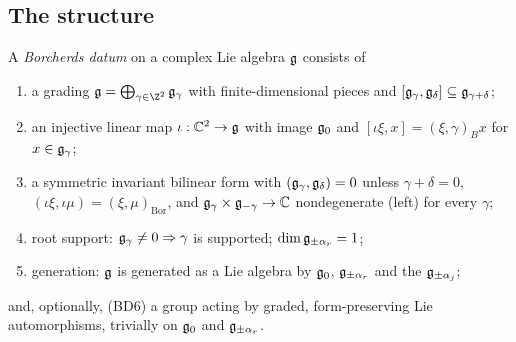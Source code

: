 \subsection{The structure}

\begin{definition}\label{ch18:def:bd}
A \emph{Borcherds datum} on a complex Lie algebra $\mathfrak{g}$ consists of
\begin{enumerate}[label=(BD\arabic*)]
\item a grading $\chXVIIIg=\bigoplus_{\gamma\in\Z^2}\chXVIIIg_\gamma$ with finite-dimensional pieces and $[\mathfrak{g}_\gamma,\mathfrak{g}_\delta]\subseteq\mathfrak{g}_{\gamma+\delta}$;
\item an injective linear map $\iota:\mathbb C^2\to\mathfrak{g}$ with image $\mathfrak{g}_0$ and $[\iota\xi,x]=(\xi,\gamma)_Bx$ for $x\in\mathfrak{g}_\gamma$;
\item a symmetric invariant bilinear form with $(\mathfrak{g}_\gamma,\mathfrak{g}_\delta)=0$ unless $\gamma+\delta=0$, $(\iota\xi,\iota\mu)=(\xi,\mu)_{\mathrm{Bor}}$, and
  $\mathfrak{g}_\gamma\times\mathfrak{g}_{-\gamma}\to\mathbb C$ nondegenerate (left) for every $\gamma$;
\item root support: $\mathfrak{g}_\gamma\neq0\Rightarrow\gamma$ is supported; $\dim\mathfrak{g}_{\pm\alpha_r}=1$;
\item generation: $\mathfrak{g}$ is generated as a Lie algebra by $\mathfrak{g}_0$, $\mathfrak{g}_{\pm\alpha_r}$ and the $\mathfrak{g}_{\pm\alpha_j}$;
\end{enumerate}
and, optionally, (BD6) a group acting by graded, form-preserving Lie automorphisms, trivially on $\mathfrak{g}_0$ and $\mathfrak{g}_{\pm\alpha_r}$.
\end{definition}
